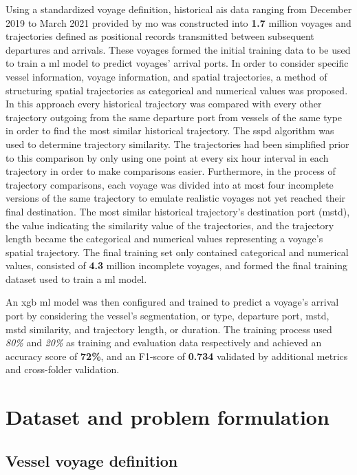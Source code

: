 Using a standardized voyage definition, historical \acrshort{ais} data ranging from December 2019 to March 2021 provided by \acrshort{mo} was constructed into \textbf{1.7} million voyages and trajectories defined as positional records transmitted between subsequent departures and arrivals. These voyages formed the initial training data to be used to train a \acrfull{ml} model to predict voyages' arrival ports. In order to consider specific vessel information, voyage information, and spatial trajectories, a method of structuring spatial trajectories as categorical and numerical values was proposed. In this approach every historical trajectory was compared with every other trajectory outgoing from the same departure port from vessels of the same type in order to find the most similar historical trajectory. The \acrfull{sspd} algorithm was used to determine trajectory similarity. The trajectories had been simplified prior to this comparison by only using one point at every six hour interval in each trajectory in order to make comparisons easier. Furthermore, in the process of trajectory comparisons, each voyage was divided into at most four incomplete versions of the same trajectory to emulate realistic voyages not yet reached their final destination. The most similar historical trajectory's destination port (\acrshort{mstd}), the value indicating the similarity value of the trajectories, and the trajectory length became the categorical and numerical values representing a voyage's spatial trajectory. The final training set only contained categorical and numerical values, consisted of \textbf{4.3} million incomplete voyages, and formed the final training dataset used to train a \acrshort{ml} model.

An \acrfull{xgb} \acrshort{ml} model was then configured and trained to predict a voyage's arrival port by considering the vessel's segmentation, or type, departure port, \acrshort{mstd}, \acrshort{mstd} similarity, and trajectory length, or duration. The training process used \textit{80\%} and \textit{20\%} as training and evaluation data respectively and achieved an accuracy score of \textbf{72\%}, and an F1-score of \textbf{0.734} validated by additional metrics and cross-folder validation.

\section{Dataset and problem formulation}

\subsection{Vessel voyage definition}

